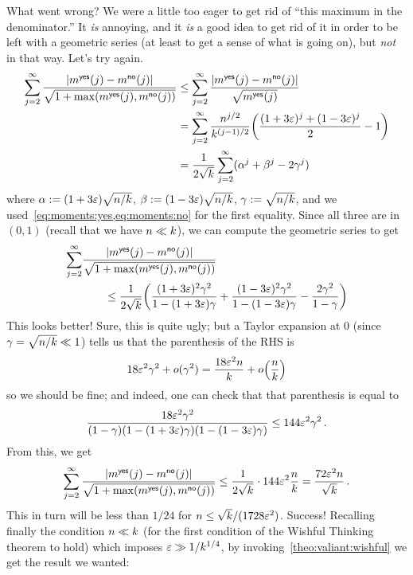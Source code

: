\noindent What went wrong? We were a little too eager to get rid of ``this maximum in the denominator.'' It \emph{is} annoying, and it \emph{is} a good idea to get rid of it in order to be left with a geometric series (at least to get a sense of what is going on), but \emph{not} in that way. Let's try again.
\begin{align*}
\sum_{j=2}^\infty \frac{\abs{m^{\yes}(j)-m^{\no}(j)}}{\sqrt{1+\max(m^{\yes}(j),m^{\no}(j))}}
&\leq
\sum_{j=2}^\infty \frac{\abs{m^{\yes}(j)-m^{\no}(j)}}{\sqrt{m^{\yes}(j)}} \\
&= \sum_{j=2}^\infty \frac{\ns^{j/2}}{\ab^{{(j-1)/2}}}\Paren{ \frac{(1+3\dst)^j + (1-3\dst)^j}{2} - 1 } \\
&= \frac{1}{2\sqrt{\ab}}\sum_{j=2}^\infty (\alpha^j+\beta^j-2\gamma^j)
\end{align*}
where $\alpha := (1+3\varepsilon)\sqrt{n/k}$, $\beta := (1-3\varepsilon)\sqrt{n/k}$, $\gamma := \sqrt{n/k}$, and we used~\cref{eq:moments:yes,eq:moments:no} for the first equality. Since all three are in $(0,1)$ (recall that we have $n \ll k$), we can compute the geometric series to get
\begin{align*}
\sum_{j=2}^\infty &\frac{\abs{m^{\yes}(j)-m^{\no}(j)}}{\sqrt{1+\max(m^{\yes}(j),m^{\no}(j))}} \\
&\qquad\leq \frac{1}{2\sqrt{\ab}}\Paren{ \frac{(1+3\dst)^2\gamma^2}{1-(1+3\dst)\gamma}+\frac{(1-3\dst)^2\gamma^2}{1-(1-3\dst)\gamma}-\frac{2\gamma^2}{1-\gamma} }
\end{align*}
This looks better! Sure, this is quite ugly; but a Taylor expansion at $0$ (since $\gamma = \sqrt{n/k} \ll 1$) tells us that the parenthesis of the RHS
is
\[
	18\dst^2 \gamma^2 + o(\gamma^2) = \frac{18\dst^2\ns}{\ab} + \littleO{\frac{\ns}{\ab}}
\]
so we should be fine; and indeed, one can check that that parenthesis is equal to
\begin{align*}
\frac{18\varepsilon^2\gamma^2}{(1-\gamma)(1-(1+3\varepsilon)\gamma)(1-(1-3\varepsilon)\gamma)} \leq 144 \varepsilon^2\gamma^2\,.
\end{align*}
From this, we get
\begin{equation}
	\sum_{j=2}^\infty \frac{\abs{m^{\yes}(j)-m^{\no}(j)}}{\sqrt{1+\max(m^{\yes}(j),m^{\no}(j))}}
	\leq \frac{1}{2\sqrt{\ab}} \cdot 144\dst^2\frac{\ns}{\ab} = \frac{72\dst^2\ns}{\sqrt{\ab}}\,.
\end{equation}
This in turn will be less than $1/24$ for $n \leq \sqrt{k}/(1728\varepsilon^2)$. Success! Recalling finally the condition $n \ll k$ (for the first condition of the Wishful Thinking theorem to hold) which imposes $\varepsilon \gg 1/k^{1/4}$, by invoking~\cref{theo:valiant:wishful} we get the result we wanted:
